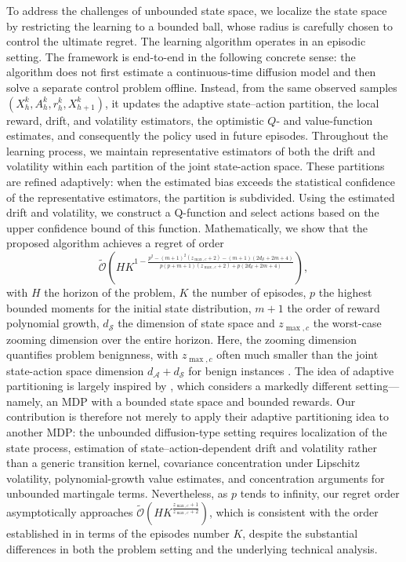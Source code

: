 \documentclass[final,supplement]{siamart251216}
\begin{document}
To address the challenges of unbounded state space, we localize the state space by restricting the learning to a bounded ball, whose radius is carefully chosen to control the ultimate regret. The learning algorithm operates in an episodic setting. The framework is end-to-end in the following concrete sense: the algorithm does not first estimate a continuous-time diffusion model and then solve a separate control problem offline. Instead, from the same observed samples $(X_h^k,A_h^k,r_h^k,X_{h+1}^k)$, it updates the adaptive state--action partition, the local reward, drift, and volatility estimators, the optimistic $Q$- and value-function estimates, and consequently the policy used in future episodes. Throughout the learning process, we maintain representative estimators of both the drift and volatility within each partition of the joint state-action space. These partitions are refined adaptively: when the estimated bias exceeds the statistical confidence of the representative estimators, the partition is subdivided. Using the estimated drift and volatility, we construct a Q-function and select actions based on the upper confidence bound of this function. Mathematically, we show that the proposed algorithm achieves a regret of order $$\tilde{\mathcal{O}}({H}K^{1-\frac{p^{2}-(m+1)^{2}(z_{\max,c}+2)-(m+1)(2d_{\mathcal{S}}+2m+4)}{p(p+m+1)(z_{\max,c}+2)+p(2d_{\mathcal{S}}+2m+4)} }),$$ with $H$ the horizon of the problem, $K$ the number of episodes, $p$ the highest bounded moments for the initial state distribution, $m+1$ the order of reward polynomial growth, $d_{\mathcal{S}}$ the dimension of state space and $z_{\max,c}$ the worst-case zooming dimension over the entire horizon. {Here, the zooming dimension quantifies problem benignness, with $z_{\max,c}$ often much smaller than the joint state-action space dimension $d_{\mathcal{A}}+d_{\mathcal{S}}$ for benign instances \cite{kleinberg2019bandits}.}
The idea of adaptive partitioning is largely inspired by \cite{sinclair2023adaptive}, which considers a markedly different setting—namely, an MDP with a bounded state space and bounded rewards. Our contribution is therefore not merely to apply their adaptive partitioning idea to another MDP: the unbounded diffusion-type setting requires localization of the state process, estimation of state--action-dependent drift and volatility rather than a generic transition kernel, covariance concentration under Lipschitz volatility, polynomial-growth value estimates, and concentration arguments for unbounded martingale terms. Nevertheless, as $p$ tends to infinity, our regret  order asymptotically approaches $\tilde{\mathcal{O}}({H}K^{\frac{z_{\max,c}+1}{z_{\max,c}+2}})$, which is consistent with the order established in \cite{sinclair2023adaptive} in terms of the episodes number $K$, despite the substantial differences in both the problem setting and the underlying technical analysis. 
\end{document}
